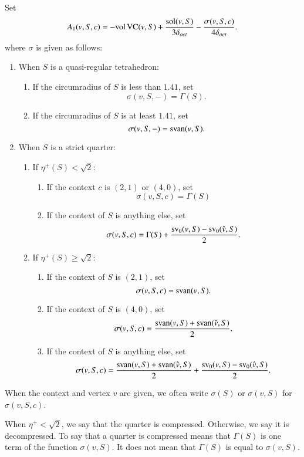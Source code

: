 \begin{definition}\label{def:sigma}
Set
   \begin{equation}\label{eqn:a1-sigma}
   A_1(v,S,c) = -{\operatorname{vol}}\,{\operatorname{VC}}(v,S)+
      \frac{\operatorname{sol}(v,S)}{3\delta_{oct}} - \frac{\sigma(v,S,c)}{4\delta_{oct}}.
      \end{equation}  where $\sigma$ is given as follows:
\begin{enumerate}
\item When $S$ is a quasi-regular tetrahedron:
   \begin{enumerate}
      \item If the circumradius of $S$ is less than $1.41$, set
         $$\sigma(v,S,-)=\Gamma(S).$$
      \item If the circumradius of $S$ is at least $1.41$, set
         $$\sigma(v,S,-)={\operatorname{svan}}(v,S).$$
   \end{enumerate}
\item When $S$ is a strict quarter:
   \begin{enumerate}
      \item If $\eta^+(S) <\sqrt2$:
         \begin{enumerate}
         \item If the context $c$ is $(2,1)$ or $(4,0)$, set
                  $$\sigma(v,S,c)=\Gamma(S)$$
         \item If the context of $S$ is anything else, set
                  $$\sigma(v,S,c)=\Gamma(S) +
                     \frac{{\operatorname{sv}}_0(v,S)
                      -{\operatorname{sv}}_0(\hat v,S)}{2}.$$
         \end{enumerate}
      \item If $\eta^+(S) \ge\sqrt2$:
         \begin{enumerate}
         \item If the context of $S$ is $(2,1)$, set
                  $$\sigma(v,S,c)={\operatorname{svan}}(v,S).$$
         \item If the context of $S$ is $(4,0)$, set
                  $$\sigma(v,S,c)=\frac{{\operatorname{svan}}(v,S)
            +{\operatorname{svan}}(\hat v,S)}{2}.$$
         \item If the context of $S$ is anything else, set
                  $$\sigma(v,S,c)=\frac{{\operatorname{svan}}(v,S)
           +{\operatorname{svan}}(\hat v,S)
                  }{2}
                     +\frac{{\operatorname{sv}}_0(v,S)-
                     {\operatorname{sv}}_0(\hat v,S)}{2}.$$
         \end{enumerate}
   \end{enumerate}
\end{enumerate}
When the context and vertex $v$ are given, we often write
$\sigma(S)$ or $\sigma(v,S)$ for $\sigma(v,S,c)$.

When $\eta^+<\sqrt2$, we say that the quarter is compressed.
Otherwise, we say it is decompressed.  To say that a quarter is
compressed means that $\Gamma(S)$ is one term of the function
$\sigma(v,S)$. It does not mean that $\Gamma(S)$ is equal to
$\sigma(v,S)$.
%
\end{definition}

